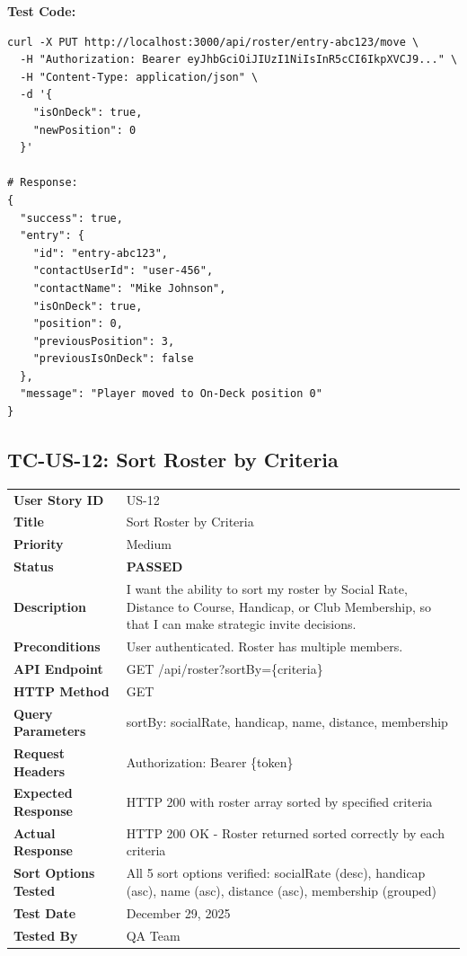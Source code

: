 \documentclass[11pt,a4paper]{article}
\newcommand{\passed}{\textcolor{pass}{\textbf{PASSED}}}
\begin{document}
\vspace{0.3cm}
\textbf{Test Code:}
\begin{lstlisting}
curl -X PUT http://localhost:3000/api/roster/entry-abc123/move \
  -H "Authorization: Bearer eyJhbGciOiJIUzI1NiIsInR5cCI6IkpXVCJ9..." \
  -H "Content-Type: application/json" \
  -d '{
    "isOnDeck": true,
    "newPosition": 0
  }'

# Response:
{
  "success": true,
  "entry": {
    "id": "entry-abc123",
    "contactUserId": "user-456",
    "contactName": "Mike Johnson",
    "isOnDeck": true,
    "position": 0,
    "previousPosition": 3,
    "previousIsOnDeck": false
  },
  "message": "Player moved to On-Deck position 0"
}
\end{lstlisting}

\vspace{0.5cm}


\subsection{TC-US-12: Sort Roster by Criteria}

\begin{tabularx}{\textwidth}{|p{3.2cm}|Y|}
\hline
{}
 \\
\hline
\textbf{User Story ID} & US-12 \\
\hline
\textbf{Title} & Sort Roster by Criteria \\
\hline
\textbf{Priority} & Medium \\
\hline
\textbf{Status} & \passed \\
\hline
\textbf{Description} & I want the ability to sort my roster by Social Rate, Distance to Course, Handicap, or Club Membership, so that I can make strategic invite decisions. \\
\hline
\textbf{Preconditions} & User authenticated. Roster has multiple members. \\
\hline
\textbf{API Endpoint} & GET /api/roster?sortBy=\{criteria\} \\
\hline
\textbf{HTTP Method} & GET \\
\hline
\textbf{Query Parameters} & sortBy: socialRate, handicap, name, distance, membership \\
\hline
\textbf{Request Headers} & Authorization: Bearer \{token\} \\
\hline
\textbf{Expected Response} & HTTP 200 with roster array sorted by specified criteria \\
\hline
\textbf{Actual Response} & HTTP 200 OK - Roster returned sorted correctly by each criteria \\
\hline
\textbf{Sort Options Tested} & All 5 sort options verified: socialRate (desc), handicap (asc), name (asc), distance (asc), membership (grouped) \\
\hline
\textbf{Test Date} & December 29, 2025 \\
\hline
\textbf{Tested By} & QA Team \\
\hline
\end{tabularx}
\end{document}
